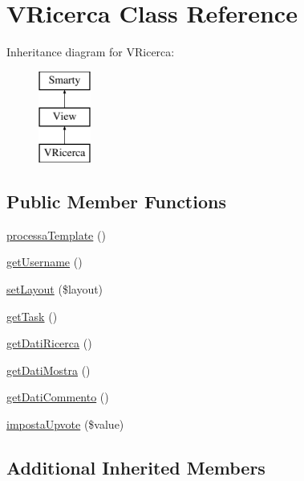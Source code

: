 \hypertarget{class_v_ricerca}{}\section{V\+Ricerca Class Reference}
\label{class_v_ricerca}
Inheritance diagram for V\+Ricerca\+:\begin{figure}[H]
\begin{center}
\leavevmode
\includegraphics[height=3.000000cm]{class_v_ricerca}
\end{center}
\end{figure}
\subsection*{Public Member Functions}
\begin{DoxyCompactItemize}
\item 
\mbox{\hyperlink{class_v_ricerca_accab76d9a06a79072c80b4014fd9f66b}{processa\+Template}} ()
\item 
\mbox{\hyperlink{class_v_ricerca_a132e577e786b857bb1381258835dd710}{get\+Username}} ()
\item 
\mbox{\hyperlink{class_v_ricerca_ac5f6a699be0236cd12a8954b309803c0}{set\+Layout}} (\$layout)
\item 
\mbox{\hyperlink{class_v_ricerca_ae254a1328432be4162826bf9b34035c6}{get\+Task}} ()
\item 
\mbox{\hyperlink{class_v_ricerca_ac0f1b275ec5c9e97bf01548ee679102a}{get\+Dati\+Ricerca}} ()
\item 
\mbox{\hyperlink{class_v_ricerca_af32f2ee10d133b234eeb8bd3359569a1}{get\+Dati\+Mostra}} ()
\item 
\mbox{\hyperlink{class_v_ricerca_a6effafa27453d04f9e50d6f4cf690732}{get\+Dati\+Commento}} ()
\item 
\mbox{\hyperlink{class_v_ricerca_a30341bd57866dd8155655fa8b64ed74c}{imposta\+Upvote}} (\$value)
\end{DoxyCompactItemize}
\subsection*{Additional Inherited Members}


